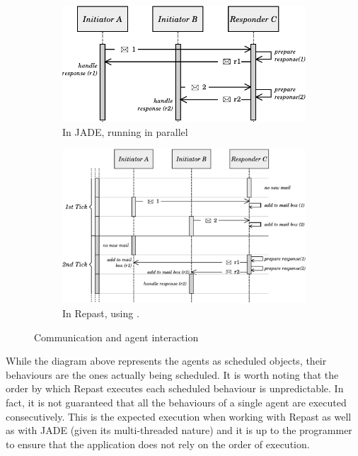 \begin{figure}[h]
	\centering
    \begin{subfigure}[b]{\linewidth}
		\centering
		\includegraphics[width=0.7\linewidth]{figures/tickExample2.pdf}
		\caption{
			In JADE, running in parallel
		}
		\label{fig:com-example-jade}
    \end{subfigure}
    \vspace{1cm}
    \begin{subfigure}[b]{\linewidth}
		\centering
		\includegraphics[width=0.9\linewidth]{figures/tickExample.pdf}
		\caption{
			In Repast, using \apiname{}.
		}
		\label{fig:com-example-repast}
    \end{subfigure}
    \caption{Communication and agent interaction}
    \label{fig:execution_example}
\end{figure}


While the diagram above represents the agents as scheduled objects, their behaviours are the ones actually being scheduled. It is worth noting that the order by which Repast executes each scheduled behaviour is unpredictable. In fact, it is not guaranteed that all the behaviours of a single agent are executed consecutively. This is the expected execution when working with Repast as well as with JADE (given its multi-threaded nature) and it is up to the programmer to ensure that the application does not rely on the order of execution.


